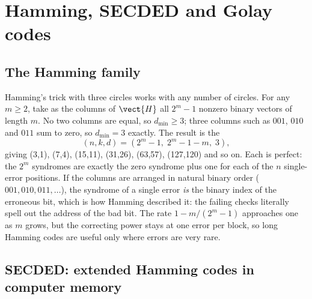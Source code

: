 \section{Hamming, SECDED and Golay codes}
\label{sec:ch14:hamming}

\subsection{The Hamming family}

Hamming's trick with three circles works with any number of circles. For any $m\ge2$, take as the
columns of $\vect{H}$ all $2^m-1$ nonzero binary vectors of length $m$. No two columns are equal, so
$d_{\min}\ge3$; three columns such as $001$, $010$ and $011$ sum to zero, so $d_{\min}=3$ exactly. The
result is the 
\begin{equation}
(n,k,d)=(2^m-1,\;2^m-1-m,\;3),
\end{equation}
giving (3,1), (7,4), (15,11), (31,26), (63,57), (127,120) and so on. Each is perfect: the
$2^m$ syndromes are exactly the zero syndrome plus one for each of the $n$ single-error
positions. If the columns are arranged in natural binary order ($001,010,011,\dots$), the
syndrome of a single error \emph{is} the binary index of the erroneous bit, which is how Hamming
described it: the failing checks literally spell out the address of the bad bit. The rate
$1-m/(2^m-1)$ approaches one as $m$ grows, but the correcting power stays at one error per block, so
long Hamming codes are useful only where errors are very rare.


\subsection{SECDED: extended Hamming codes in computer memory}

